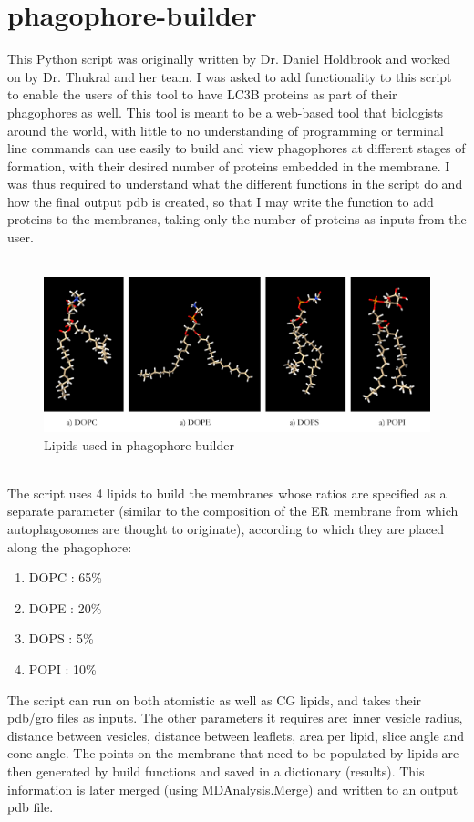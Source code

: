 \documentclass[12pt, a4paper]{report}
\begin{document}
\clearpage
\newpage
\section*{phagophore-builder} 

This Python script was originally written by Dr. Daniel Holdbrook and worked on by Dr. Thukral and her team. I was asked to add functionality to this script to enable the users of this tool to have LC3B proteins as part of their phagophores as well. This tool is meant to be a web-based tool that biologists around the world, with little to no understanding of programming or terminal line commands can use easily to build and view phagophores at different stages of formation, with their desired number of proteins embedded in the membrane. I was thus required to understand what the different functions in the script do and how the final output pdb is created, so that I may write the function to add proteins to the membranes, taking only the number of proteins as inputs from the user. 
\\~\\
\begin{figure}[h]
    \includegraphics[scale=0.55]{images/phagophore lipids.png} 
    \centering 
    \caption{Lipids used in phagophore-builder}
    \centering
\end{figure} 
\\
The script uses 4 lipids to build the membranes whose ratios are specified as a separate parameter (similar to the composition of the ER membrane from which autophagosomes are thought to originate), according to which they are placed along the phagophore: 
\begin{enumerate}
    \item DOPC : 65\% 
    \item DOPE : 20\% 
    \item DOPS : 5\% 
    \item POPI : 10\%
\end{enumerate}
The script can run on both atomistic as well as CG lipids, and takes their pdb/gro files as inputs. The other parameters it requires are: inner vesicle radius, distance between vesicles, distance between leaflets, area per lipid, slice angle and cone angle. The points on the membrane that need to be populated by lipids are then generated by build functions and saved in a dictionary (results). This information is later merged (using MDAnalysis.Merge) and written to an output pdb file. 
\\~\\
\end{document}
